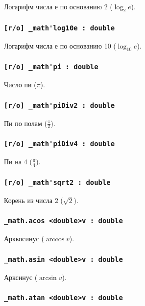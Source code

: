 \documentclass[a4paper, 14pt]{extarticle}
\begin{document}
Логарифм числа е по основанию 2 ($\log_{2}{e}$).

\subsubsection{\lstinline|[r/o] _math'log10e : double|}

Логарифм числа е по основанию 10 ($\log_{10}{e}$).

\subsubsection{\lstinline|[r/o] _math'pi : double|}

Число пи ($\pi$).

\subsubsection{\lstinline|[r/o] _math'piDiv2 : double|}

Пи по полам ($\frac{\pi}{2}$).

\subsubsection{\lstinline|[r/o] _math'piDiv4 : double|}

Пи на 4 ($\frac{\pi}{4}$).

\subsubsection{\lstinline|[r/o] _math'sqrt2 : double|}

Корень из числа 2 ($\sqrt{2}$).

\subsubsection{\lstinline|_math.acos <double>v : double|}

Арккосинус ($\arccos{v}$).

\subsubsection{\lstinline|_math.asin <double>v : double|}

Арксинус ($\arcsin{v}$).

\subsubsection{\lstinline|_math.atan <double>v : double|}
\end{document}
